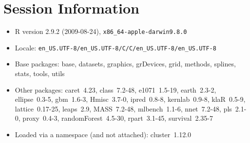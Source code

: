 \documentclass[12pt]{article}
\begin{document}
\section{Session Information}

\begin{itemize}
  \item R version 2.9.2 (2009-08-24), \verb|x86_64-apple-darwin9.8.0|
  \item Locale: \verb|en_US.UTF-8/en_US.UTF-8/C/C/en_US.UTF-8/en_US.UTF-8|
  \item Base packages: base, datasets, graphics, grDevices, grid,
    methods, splines, stats, tools, utils
  \item Other packages: caret~4.23, class~7.2-48, e1071~1.5-19,
    earth~2.3-2, ellipse~0.3-5, gbm~1.6-3, Hmisc~3.7-0, ipred~0.8-8,
    kernlab~0.9-8, klaR~0.5-9, lattice~0.17-25, leaps~2.9, MASS~7.2-48,
    mlbench~1.1-6, nnet~7.2-48, pls~2.1-0, proxy~0.4-3,
    randomForest~4.5-30, rpart~3.1-45, survival~2.35-7
  \item Loaded via a namespace (and not attached): cluster~1.12.0
\end{itemize}
\end{document}
